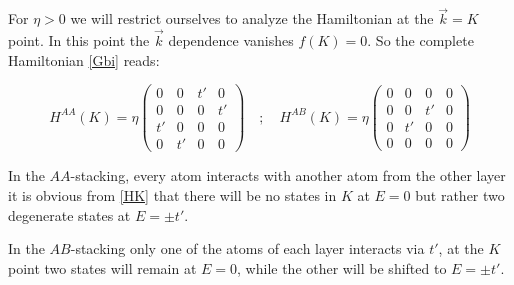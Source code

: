 For $\eta>0$ we will restrict ourselves to analyze the Hamiltonian at the $\vec{k}=K$ point. In this point the $\vec{k}$ dependence vanishes $f(K)=0$. So the complete Hamiltonian \eqref{Gbi} reads:

\begin{equation}
   H^{AA}(K) = \eta\left(\begin{array}{cc|cc}
         0 & 0 & t' & 0 \\
         0 & 0 & 0 & t' \\\hline
         t' & 0 & 0 & 0 \\
         0 & t' & 0 & 0
   \end{array}\right)\quad;\quad
   H^{AB}(K) = \eta\left(\begin{array}{c|cc|c}
         0 & 0 & 0 & 0 \\ \hline
         0 & 0 & t' & 0 \\
         0 & t' & 0 & 0 \\ \hline
         0 & 0 & 0 & 0
   \end{array}\right)
\label{HK}
\end{equation}

In the $AA$-stacking, every atom interacts with another atom from the other layer it is obvious from \eqref{HK} that there will be no states in $K$ at $E=0$ but rather two degenerate states at $E=\pm t'$.


In the $AB$-stacking only one of the atoms of each layer interacts via $t'$, at the $K$ point two states will remain at $E=0$, while the other will be shifted to $E=\pm t'$.

